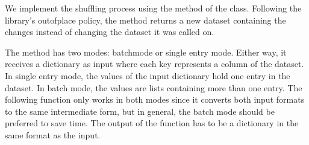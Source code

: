 \documentclass[letterpaper,10pt,english]{jupyterBook}
\begin{document}
\sphinxAtStartPar
We implement the shuffling process using the \sphinxhyphen{}method of the \sphinxhyphen{}class.
Following the library’s out\sphinxhyphen{}of\sphinxhyphen{}place policy, the \sphinxhyphen{}method returns a new dataset containing the changes instead of changing the dataset it was called on.

\sphinxAtStartPar
The \sphinxhyphen{}method has two modes: batch\sphinxhyphen{}mode or single entry mode. Either way, it receives a dictionary as input where each key represents a column of the dataset.
In single entry mode, the values of the input dictionary hold one entry in the dataset.
In batch mode, the values are lists containing more than one entry.
The following function only works in both modes since it converts both input formats to the same intermediate form, but in general, the batch mode should be preferred to save time.
The output of the function has to be a dictionary in the same format as the input.
\end{document}
